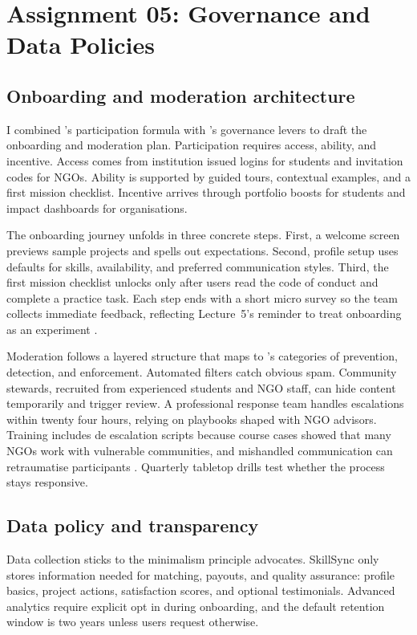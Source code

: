 \section*{Assignment 05: Governance and Data Policies}

\subsection*{Onboarding and moderation architecture}
I combined \citet{Choudary2016}'s participation formula with \citet{Reillier2017}'s governance levers to draft the onboarding and moderation plan. Participation requires access, ability, and incentive. Access comes from institution issued logins for students and invitation codes for NGOs. Ability is supported by guided tours, contextual examples, and a first mission checklist. Incentive arrives through portfolio boosts for students and impact dashboards for organisations.

The onboarding journey unfolds in three concrete steps. First, a welcome screen previews sample projects and spells out expectations. Second, profile setup uses defaults for skills, availability, and preferred communication styles. Third, the first mission checklist unlocks only after users read the code of conduct and complete a practice task. Each step ends with a short micro survey so the team collects immediate feedback, reflecting Lecture~5's reminder to treat onboarding as an experiment \citep{Lecture05}.

Moderation follows a layered structure that maps to \citet{Choudary2016}'s categories of prevention, detection, and enforcement. Automated filters catch obvious spam. Community stewards, recruited from experienced students and NGO staff, can hide content temporarily and trigger review. A professional response team handles escalations within twenty four hours, relying on playbooks shaped with NGO advisors. Training includes de escalation scripts because course cases showed that many NGOs work with vulnerable communities, and mishandled communication can retraumatise participants \citep{Lecture11}. Quarterly tabletop drills test whether the process stays responsive.

\subsection*{Data policy and transparency}
Data collection sticks to the minimalism principle \citet{Zuboff2019} advocates. SkillSync only stores information needed for matching, payouts, and quality assurance: profile basics, project actions, satisfaction scores, and optional testimonials. Advanced analytics require explicit opt in during onboarding, and the default retention window is two years unless users request otherwise.

